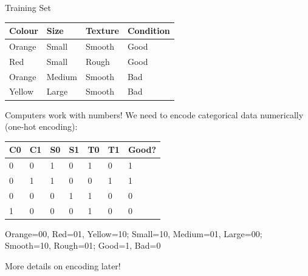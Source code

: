\documentclass[usenames,dvipsnames]{beamer}
\begin{document}
\begin{frame}{Training Set}
\vspace{-5pt}
\begin{table}[]
	\begin{tabular}{|l|l|l||l|}
		\hline 
		\rowcolor{white}
		\cellcolor{Lavender}\textbf{Colour} & \cellcolor{Lavender}\textbf{Size} & \cellcolor{Lavender}\textbf{Texture} & \cellcolor{Tan}\textbf{Condition} \\ \hline 
		\cellcolor{Lavender}Orange & \cellcolor{Lavender}Small & \cellcolor{Lavender}Smooth  & \cellcolor{Tan}Good      \\
		\cellcolor{Lavender}Red    & \cellcolor{Lavender}Small  & \cellcolor{Lavender}Rough  & \cellcolor{Tan}Good \\
		\cellcolor{Lavender}Orange & \cellcolor{Lavender}Medium & \cellcolor{Lavender}Smooth & \cellcolor{Tan}Bad \\
		\cellcolor{Lavender}Yellow & \cellcolor{Lavender}Large  & \cellcolor{Lavender}Smooth & \cellcolor{Tan}Bad \\ \hline 
		
	\end{tabular}
\end{table}

\pause Computers work with numbers! We need to encode categorical data numerically (one-hot encoding):

\begin{table}[]
	\begin{tabular}{|l|l||l|l||l|l||l|}
		\hline 
		\rowcolor{white}
		\cellcolor{Lavender}\textbf{C0} & \cellcolor{Lavender}\textbf{C1} & \cellcolor{Lavender}\textbf{S0} & \cellcolor{Lavender}\textbf{S1} & \cellcolor{Lavender}\textbf{T0} & \cellcolor{Lavender}\textbf{T1} & \cellcolor{Tan}\textbf{Good?} \\ \hline 
		\cellcolor{Lavender}0 & \cellcolor{Lavender}0 & \cellcolor{Lavender}1 & \cellcolor{Lavender}0 & \cellcolor{Lavender}1 & \cellcolor{Lavender}0 & \cellcolor{Tan}1 \\
		\cellcolor{Lavender}0 & \cellcolor{Lavender}1 & \cellcolor{Lavender}1 & \cellcolor{Lavender}0 & \cellcolor{Lavender}0 & \cellcolor{Lavender}1 & \cellcolor{Tan}1 \\
		\cellcolor{Lavender}0 & \cellcolor{Lavender}0 & \cellcolor{Lavender}0 & \cellcolor{Lavender}1 & \cellcolor{Lavender}1 & \cellcolor{Lavender}0 & \cellcolor{Tan}0 \\
		\cellcolor{Lavender}1 & \cellcolor{Lavender}0 & \cellcolor{Lavender}0 & \cellcolor{Lavender}0 & \cellcolor{Lavender}1 & \cellcolor{Lavender}0 & \cellcolor{Tan}0 \\ \hline 
	\end{tabular}
\end{table}

\pause Orange=00, Red=01, Yellow=10; Small=10, Medium=01, Large=00; Smooth=10, Rough=01; Good=1, Bad=0

More details on encoding later!
\end{frame}
\end{document}
